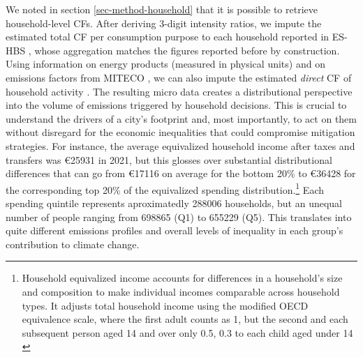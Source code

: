 \documentclass[
  10pt,
  twocolumn]{aft}
\begin{document}
We noted in section \ref{sec-method-household} that it is possible to
retrieve household-level CFs. After deriving 3-digit intensity ratios,
we impute the estimated total CF per consumption purpose to each
household reported in ES-HBS \citep{ine_encuesta_2024}, whose
aggregation matches the figures reported before by construction. Using
information on energy products (measured in physical units) and on
emissions factors from MITECO \citep{miteco_calculadora_2023}, we can
also impute the estimated \emph{direct} CF of household activity
\citep{corcoles_carbon_2024}. The resulting micro data creates a
distributional perspective into the volume of emissions triggered by
household decisions. This is crucial to understand the drivers of a
city's footprint and, most importantly, to act on them without disregard
for the economic inequalities that could compromise mitigation
strategies. For instance, the average equivalized household income after
taxes and transfers was \euro 25931 in 2021, but this glosses over
substantial distributional differences that can go from \euro 17116 on
average for the bottom 20\% to \euro 36428 for the corresponding top
20\% of the equivalized spending distribution.\footnote{Household
  equivalized income accounts for differences in a household's size and
  composition to make individual incomes comparable across household
  types. It adjusts total household income using the modified OECD
  equivalence scale, where the first adult counts as 1, but the second
  and each subsequent person aged 14 and over only 0.5, 0.3 to each
  child aged under 14 \citep{deatonAnalysisHouseholdSurveys1997}} Each
spending quintile represents aproximatedly 288006 households, but an
unequal number of people ranging from 698865 (Q1) to 655229 (Q5). This
translates into quite different emissions profiles and overall levels of
inequality in each group's contribution to climate change.
\end{document}
